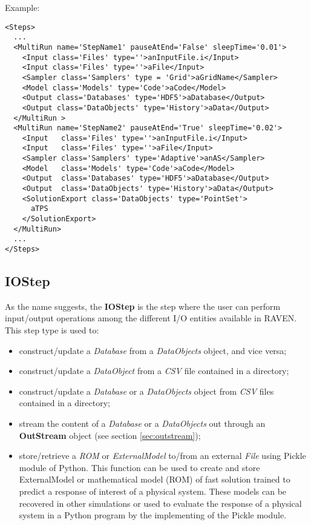 Example:
\begin{lstlisting}[style=XML,morekeywords={pauseAtEnd,sleepTime,class}]
<Steps>
  ...
  <MultiRun name='StepName1' pauseAtEnd='False' sleepTime='0.01'>
    <Input class='Files' type=''>anInputFile.i</Input>
    <Input class='Files' type=''>aFile</Input>
    <Sampler class='Samplers' type = 'Grid'>aGridName</Sampler>
    <Model class='Models' type='Code'>aCode</Model>
    <Output class='Databases' type='HDF5'>aDatabase</Output>
    <Output class='DataObjects' type='History'>aData</Output>
  </MultiRun >
  <MultiRun name='StepName2' pauseAtEnd='True' sleepTime='0.02'>
    <Input   class='Files' type=''>anInputFile.i</Input>
    <Input   class='Files' type=''>aFile</Input>
    <Sampler class='Samplers' type='Adaptive'>anAS</Sampler>
    <Model   class='Models' type='Code'>aCode</Model>
    <Output  class='Databases' type='HDF5'>aDatabase</Output>
    <Output  class='DataObjects' type='History'>aData</Output>
    <SolutionExport class='DataObjects' type='PointSet'>
      aTPS
    </SolutionExport>
  </MultiRun>
  ...
</Steps>
\end{lstlisting}

\subsection{IOStep}
\label{subsec:stepIOStep}
As the name suggests, the \textbf{IOStep} is the step where the user can perform
input/output operations among the different I/O entities available in RAVEN.
%
This step type is used to:
\begin{itemize}
 \item construct/update a \textit{Database} from a \textit{DataObjects} object, and
   vice versa;
 \item construct/update a \textit{DataObject} from a
   \textit{CSV} file contained in a directory;
 \item construct/update a \textit{Database} or a \textit{DataObjects} object from
   \textit{CSV} files contained in a directory;
 \item stream the content of a \textit{Database} or a \textit{DataObjects} out through
   an \textbf{OutStream} object (see section \ref{sec:outstream});
 \item store/retrieve a \textit{ROM} or  \textit{ExternalModel} to/from an external \textit{File} using Pickle module
 of Python. This function can be used to create and store ExternalModel or mathematical model (ROM) of fast solution
 trained to predict a response of interest of a physical system. These models can be
recovered in other simulations or used to evaluate the response of a physical system
 in a Python program by the implementing of the Pickle module.
\end{itemize}

